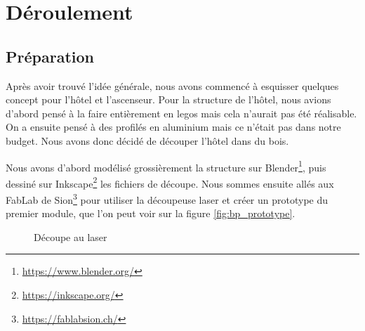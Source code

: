 \chapter{Déroulement}
\section{Préparation}
Après avoir trouvé l'idée générale, nous avons commencé à esquisser quelques concept pour l'hôtel et l'ascenseur.
Pour la structure de l'hôtel, nous avions d'abord pensé à la faire entièrement en legos mais cela n'aurait pas été réalisable.
On a ensuite pensé à des profilés en aluminium mais ce n'était pas dans notre budget.
Nous avons donc décidé de découper l'hôtel dans du bois.

Nous avons d'abord modélisé grossièrement la structure sur Blender\footnote{\url{https://www.blender.org/}}, puis dessiné sur Inkscape\footnote{\url{https://inkscape.org/}} les fichiers de découpe.
Nous sommes ensuite allés aux FabLab de Sion\footnote{\url{https://fablabsion.ch/}} pour utiliser la découpeuse laser et créer un prototype du premier module, que l'on peut voir sur la figure \ref{fig:bp_prototype}.

\begin{figure}[H]
  \centering
  \caption{Découpe au laser}
  \label{fig:bp_laser}
\end{figure}

